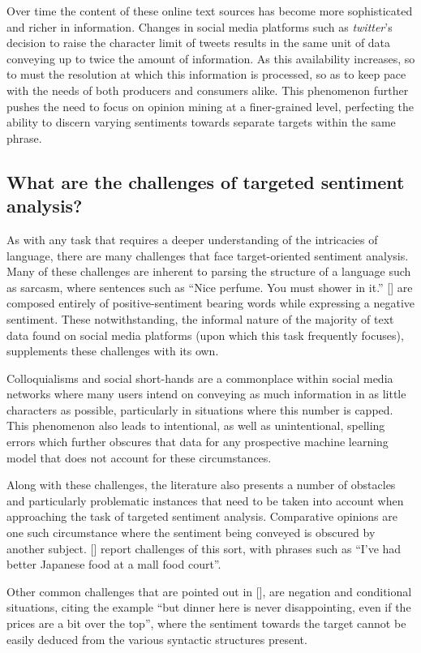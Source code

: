 \documentclass[12pt, a4paper]{report}
\theoremstyle{definition}
\theoremstyle{definition}%
\theoremstyle{definition}%
\theoremstyle{definition}%
\theoremstyle{definition}%
\theoremstyle{definition}%
\renewcommand{\cite}[1]{[\citealp{#1}]}
\begin{document}
Over time the content of these online text sources has become more sophisticated and richer in information. Changes in social media platforms such as \textit{twitter}'s decision to raise the character limit of tweets results in the same unit of data conveying up to twice the amount of information. As this availability increases, so to must the resolution at which this information is processed, so as to keep pace with the needs of both producers and consumers alike. This phenomenon further pushes the need to focus on opinion mining at a finer-grained level, perfecting the ability to discern varying sentiments towards separate targets within the same phrase.

\subsection{What are the challenges of targeted sentiment analysis?}
As with any task that requires a deeper understanding of the intricacies of language, there are many challenges that face target-oriented sentiment analysis. Many of these challenges are inherent to parsing the structure of a language such as sarcasm, where sentences such as \enquote{Nice perfume. You must shower in it.} \cite{kharde2016} are composed entirely of positive-sentiment bearing words while expressing a negative sentiment. These notwithstanding, the informal nature of the majority of text data found on social media platforms (upon which this task frequently focuses), supplements these challenges with its own.

Colloquialisms and social short-hands are a commonplace within social media networks where many users intend on conveying as much information in as little characters as possible, particularly in situations where this number is capped. This phenomenon also leads to intentional, as well as unintentional, spelling errors which further obscures that data for any prospective machine learning model that does not account for these circumstances.

Along with these challenges, the literature also presents a number of obstacles and particularly problematic instances that need to be taken into account when approaching the task of targeted sentiment analysis. Comparative opinions are one such circumstance where the sentiment being conveyed is obscured by another subject. \cite{tang2016} report challenges of this sort, with phrases such as \enquote{I've had better Japanese food at a mall food court}.

Other common challenges that are pointed out in \cite{tang2016}, are negation and conditional situations, citing the example \enquote{but dinner here is never disappointing, even if the prices are a bit over the top}, where the sentiment towards the target cannot be easily deduced from the various syntactic structures present.
\end{document}
